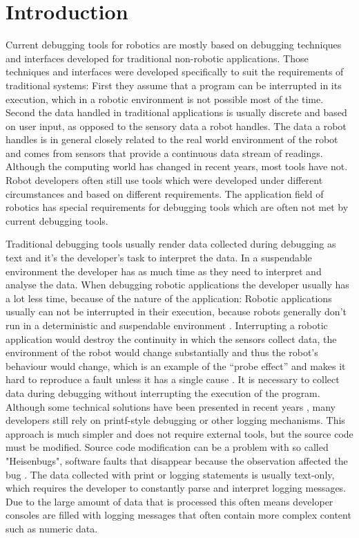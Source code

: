 \chapter{Introduction}
\review

Current debugging tools for robotics are mostly based on debugging techniques and interfaces developed for traditional non-robotic applications. Those techniques and interfaces were developed specifically to suit the requirements of traditional systems: First they assume that a program can be interrupted in its execution, which in a robotic environment is not possible most of the time. Second the data handled in traditional applications is usually discrete and based on user input, as opposed to the sensory data a robot handles. The data a robot handles is in general closely related to the real world environment of the robot and comes from sensors that provide a continuous data stream of readings. Although the computing world has changed in recent years, most tools have not. Robot developers often still use tools which were developed under different circumstances and based on different requirements. The application field of robotics has special requirements for debugging tools which are often not met by current debugging tools.

Traditional debugging tools usually render data collected during debugging as text and it's the developer's task to interpret the data. In a suspendable environment the developer has as much time as they need to interpret and analyse the data. When debugging robotic applications the developer usually has a lot less time, because of the nature of the application: Robotic applications usually can not be interrupted in their execution, because robots generally don't run in a deterministic and suspendable environment \cite{Gumbley2009}. Interrupting a robotic application would destroy the continuity in which the sensors collect data, the environment of the robot would change substantially and thus the robot's behaviour would change, which is an example of the ``probe effect'' and makes it hard to reproduce a fault unless it has a single cause \cite{Gumbley2009}. It is necessary to collect data during debugging without interrupting the execution of the program. Although some technical solutions have been presented in recent years \cite{Gumbley2009}, many developers still rely on printf-style debugging or other logging mechanisms. This approach is much simpler and does not require external tools, but the source code must be modified. Source code modification can be a problem with so called "Heisenbugs", software faults that disappear because the observation affected the bug \cite{Grottke2005}. The data collected with print or logging statements is usually text-only, which requires the developer to constantly parse and interpret logging messages. Due to the large amount of data that is processed this often means developer consoles are filled with logging messages that often contain more complex content such as numeric data.

